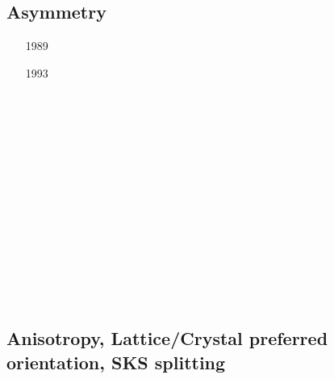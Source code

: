 \subsection{Asymmetry}
\label{sec:topics:asymmetry}

\begin{scriptsize}
\begin{itemize}
\item[1989]
\textcite{brbe89b} \\
\item[1993]
\textcite{gowo93} \\
\item[\twothousandthree]
\textcite{hube03} \\
\item[\twothousandsix]
\textcite{coma06} \\
\item[\twothousandeight]
\textcite{vanv08} \\
\textcite{naht08} \\
\item[\twothousandeleven]
\textcite{vanj11} \\
\item[\twothousandfourteen]
\textcite{buge14} \\
\textcite{flgw14} \\
\item[\twothousandfifteen]
\textcite{svlh15} \\
\item[\twothousandsixteen]
\textcite{frsc16} \\
\end{itemize}
\end{scriptsize}


\subsection{Anisotropy, Lattice/Crystal preferred orientation, SKS splitting}
\label{sec:topics:anisotropy}


